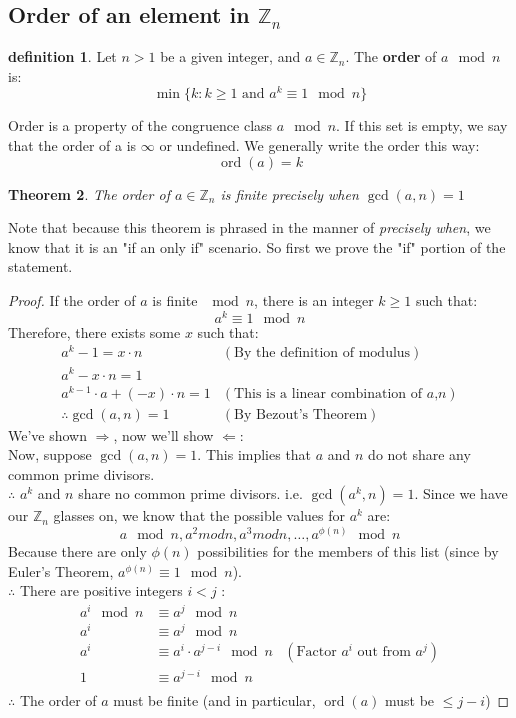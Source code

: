\documentclass[10pt]{article}
\newcommand{\Z}{\mathbb{Z}}
\newtheorem{theorem}{Theorem}
\theoremstyle{definition}
\newtheorem{definition}[theorem]{definition}
\theoremstyle{remark}
\def\Z{\mathbb{ Z}}
\DeclareMathOperator{\ord}{ord}
\begin{document}
\subsection{Order of an element in $\Z_n$}
\begin{definition}
Let $n>1$ be a given integer, and $a \in \Z_n$.  The \textbf{order} of $a \mod n$ is: 
$$\min\{k: k \geq 1 \text{ and } a^k \equiv 1 \mod n \}$$
\end{definition}
Order is a property of the congruence class $a \mod n$.  If this set is empty, we say that the order of a is $\infty$ or undefined. We generally write the order this way: $$\ord(a)=k $$
\begin{theorem}
The order of $a \in \Z_n$ is finite precisely when $\gcd(a,n)=1$
\end{theorem}
Note that because this theorem is phrased in the manner of \textit{precisely when}, we know that it is an "if an only if" scenario.  So first we prove the "if" portion of the statement.
\begin{proof}
If the order of $a$ is finite $\mod n$, there is an integer $k \geq 1$ such that: $$ a^k \equiv 1 \mod n$$
Therefore, there exists some $x$ such that:
\begin{align*}
a^k-1 = x \cdot n &(\text{By the definition of modulus})\\
a^k-x \cdot n = 1\\
a^{k-1}\cdot a + (-x)\cdot n = 1 &(\text{This is a linear combination of $a$,$n$})\\
\therefore \gcd(a,n) = 1 &(\text{By Bezout's Theorem})
\end{align*}
We've shown $\Rightarrow$, now we'll show $\Leftarrow$:\\
Now, suppose $\gcd(a,n)=1$.  This implies that $a$ and $n$ do not share any common prime divisors.\\
$\therefore$ $a^k$ and $n$ share no common prime divisors.  i.e. $\gcd(a^k,n)=1$.  Since we have our $\Z_n$ glasses on, we know that the possible values for $a^k$ are: $$ a\mod n, a^2 mod n, a^3 mod n, \ldots , a^{\phi(n)}\mod n$$
Because there are only $\phi(n)$ possibilities for the members of this list (since by Euler's Theorem, $a^{\phi(n)} \equiv 1 \mod n$).\\
$\therefore$ There are positive integers $i < j$ :
\begin{align*}
a^i \mod n &\equiv a^j \mod n &\\
a^i &\equiv a^j \mod n &\\
a^i &\equiv a^i \cdot a^{j-i} \mod n &(\text{Factor $a^i$ out from $a^j$})\\
1 &\equiv a^{j-i} \mod n &\\
\end{align*}
$\therefore$ The order of $a$ must be finite (and in particular, $\ord(a)$ must be $\leq j-i$)
\end{proof}
\end{document}
